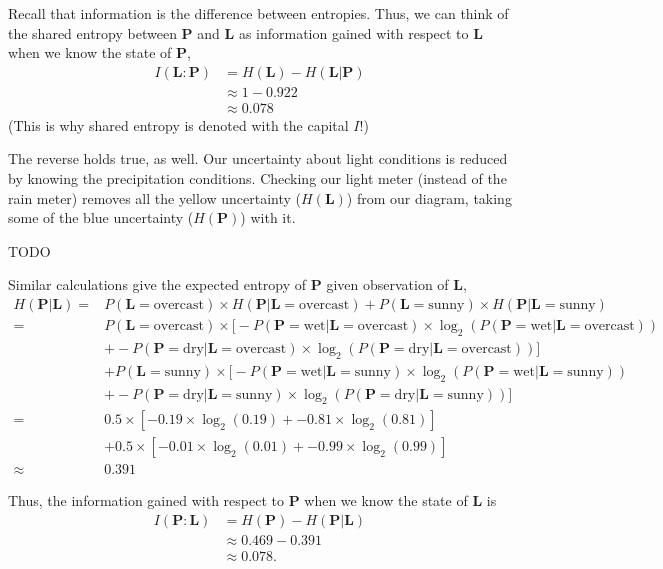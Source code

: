 Recall that information is the difference between entropies.
Thus, we can think of the shared entropy between $\bm{P}$ and $\bm{L}$ as information gained with respect to $\bm{L}$ when we know the state of $\bm{P}$,
\begin{align*}
I(\bm{L} : \bm{P})
&=
H(\bm{L}) - H(\bm{L} | \bm{P}) \\
&\approx
1 - 0.922 \\
&\approx
0.078
\end{align*}
(This is why shared entropy is denoted with the capital $I$!)

The reverse holds true, as well.
Our uncertainty about light conditions is reduced by knowing the precipitation conditions.
Checking our light meter (instead of the rain meter) removes all the yellow uncertainty ($H(\bm{L})$) from our diagram, taking some of the blue uncertainty ($H(\bm{P})$) with it.
\begin{center}
TODO
\end{center}
Similar calculations give the expected entropy of $\bm{P}$ given observation of $\bm{L}$,
\begin{align*}
H(\bm{P} | \bm{L})
=&
P(\bm{L} = \text{overcast}) \times H(\bm{P} | \bm{L} = \text{overcast})
+ P(\bm{L} = \text{sunny}) \times H(\bm{P} | \bm{L} = \text{sunny}) \\
=&
P(\bm{L} = \text{overcast}) \times \Big[ - P(\bm{P} = \text{wet} | \bm{L} = \text{overcast}) \times \log_2(P(\bm{P} = \text{wet} | \bm{L} = \text{overcast})) \\
&+ - P(\bm{P} = \text{dry} | \bm{L} = \text{overcast}) \times \log_2(P(\bm{P} = \text{dry} | \bm{L} = \text{overcast})) \Big] \\
&+ P(\bm{L} = \text{sunny})\times \Big[ - P(\bm{P} = \text{wet} | \bm{L} = \text{sunny}) \times \log_2(P(\bm{P} = \text{wet} | \bm{L} = \text{sunny})) \\
&+ - P(\bm{P} = \text{dry} | \bm{L} = \text{sunny}) \times \log_2(P(\bm{P} = \text{dry} | \bm{L} = \text{sunny})) \Big] \\
=&
0.5 \times [ - 0.19 \times \log_2(0.19) + - 0.81 \times \log_2(0.81) ] \\
&+ 0.5 \times [ - 0.01 \times \log_2(0.01) + - 0.99 \times \log_2(0.99) ] \\
\approx&
0.391
\end{align*}

Thus, the information gained with respect to $\bm{P}$ when we know the state of $\bm{L}$ is
\begin{align*}
I(\bm{P} : \bm{L})
&=
H(\bm{P}) - H(\bm{P} | \bm{L}) \\
&\approx
0.469 - 0.391 \\
&\approx
0.078.
\end{align*}

